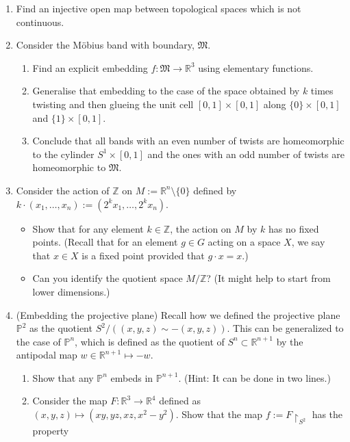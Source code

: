 \documentclass[notoc,notitlepage]{tufte-book}
\begin{document}
\begin{enumerate}
	\item Find an injective open map between topological spaces which is not continuous.
  \item Consider the M\"{o}bius band with boundary, $\mathfrak{M}$.
    \begin{enumerate}
      \item Find an explicit embedding $f : \mathfrak{M} \to \mathbb{R}^3$ using elementary
        functions.
      \item Generalise that embedding to the case of the space obtained by $k$ times twisting
        and then glueing the unit cell $[0, 1] \times [0, 1]$ along $\{ 0 \} \times [0, 1]$ and
        $\{ 1 \} \times [0, 1]$.
      \item Conclude that all bands with an even number of twists are homeomorphic to the cylinder
        $S^1 \times [0, 1]$ and the ones with an odd number of twists are homeomorphic to
        $\mathfrak{M}$.
    \end{enumerate}
  \item Consider the action of $\mathbb{Z}$ on $M := \mathbb{R}^n \setminus \{0\}$ 
    defined by $k \cdot (x_1, \ldots, x_n) := (2^k x_1, \ldots, 2^k x_n)$.
    \begin{itemize}
      \item Show that for any element $k \in \mathbb{Z}$, the action on $M$ by $k$ has no fixed
        points. (Recall that for an element $g \in G$ acting on a space $X$, we say that $x \in
        X$ is a fixed point provided that $g \cdot x = x$.)
      \item Can you identify the quotient space $M / \mathbb{Z}$? (It might help to start from
        lower dimensions.)
    \end{itemize}
  \item (Embedding the projective plane) Recall how we defined the projective plane
    $\mathbb{P}^2$ as the quotient $S^2 / ((x, y, z) \sim -(x, y, z))$. This can be generalized to
    the case of $\mathbb{P}^n$, which is defined as the quotient of $S^n \subset \mathbb{R}^{n + 1}$
    by the antipodal map $w \in \mathbb{R}^{n + 1} \mapsto - w$.
    \begin{enumerate}
      \item Show that any $\mathbb{P}^n$ embeds in $\mathbb{P}^{n + 1}$. (Hint: It can be done in
        two lines.)
      \item Consider the map $F : \mathbb{R}^3 \to \mathbb{R}^4$ defined as $(x, y, z) \mapsto
        (xy, yz, xz, x^2 - y^2)$. Show that the map $f := F \restriction_{S^2}$ has the property

\end{enumerate}
\end{enumerate}
\end{document}
